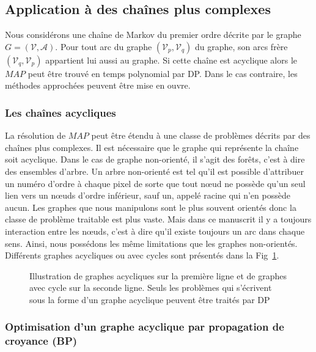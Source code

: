 \documentclass[../main/These_Mathias_Paget.tex]{subfiles}
\begin{document}
\subsection{Application à des chaînes plus complexes}
\label{ss:chaine_complex}

Nous considérons une chaîne de Markov du premier ordre décrite par le graphe $G=(\boldsymbol{\mathcal{V}},\boldsymbol{\mathcal{A}})$. Pour tout arc du graphe $(\mathcal{V}_p,\mathcal{V}_q)$ du graphe, son arcs frère $(\mathcal{V}_q,\mathcal{V}_p)$ appartient lui aussi au graphe. Si cette chaîne est acyclique alors le $MAP$ peut être trouvé en temps polynomial par DP. Dans le cas contraire, les méthodes approchées peuvent être mise en ouvre.

\subsubsection{Les chaînes acycliques}

La résolution de $MAP$ peut être étendu à une classe de problèmes décrits par des chaînes plus complexes. Il est nécessaire que le graphe qui représente la chaîne soit acyclique. Dans le cas de graphe non-orienté, il s'agit des forêts, c'est à dire des ensembles d'arbre. Un arbre non-orienté est tel qu'il est possible d'attribuer un numéro d'ordre à chaque pixel de sorte que tout nœud ne possède qu'un seul lien vers un nœuds d'ordre inférieur, sauf un, appelé racine qui n'en possède aucun. Les graphes que nous manipulons sont le plus souvent orientés donc la classe de problème traitable est plus vaste. Mais dans ce manuscrit il y a toujours interaction entre les nœuds, c'est à dire qu'il existe toujours un arc dans chaque sens. Ainsi, nous possédons les même limitations que les graphes non-orientés. Différents graphes acycliques ou avec cycles sont présentés dans la Fig~\ref{fig:tree_ex}.

\begin{figure}
\centering

\caption{Illustration de graphes acycliques sur la première ligne et de graphes avec cycle sur la seconde ligne. Seuls les problèmes qui s'écrivent sous la forme d'un graphe acyclique peuvent être traités par DP}
\label{fig:tree_ex}
\end{figure}

\subsubsection{Optimisation d'un graphe acyclique par propagation de croyance (BP)}
\end{document}
